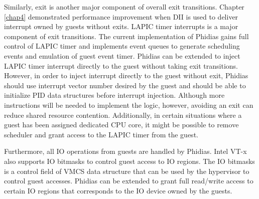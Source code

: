 Similarly, \mextinterrupt{} exit is another major component of overall exit transitions. 
Chapter \ref{chap4} demonstrated performance improvement when DII is used to deliver interrupt owned by guests without exits.
LAPIC timer interrupts is a major component of \mextinterrupt{}  exit transitions.
The current implementation of Phidias gains full control of LAPIC timer and implements event queues 
to generate scheduling events and emulation of guest event timer.
Phidias can be extended to inject LAPIC timer interrupt directly to the guest without taking exit transitions.
However, in order to inject interrupt directly to the guest without exit, Phidias should use interrupt vector number desired by the guest 
and should be able to initialize PID data structures before interrupt injection.
Although more instructions will be needed to implement the logic, however, avoiding an exit can reduce shared resource contention.
Additionally, in certain situations where a guest has been assigned dedicated CPU core, 
it might be possible to remove scheduler and grant access to the LAPIC timer from the guest.

Furthermore, all IO operations from guests are handled by Phidias.
Intel VT-x also supports IO bitmasks to control guest access to IO regions. 
The IO bitmasks is a control field of VMCS data structure that can be used by the hypervisor to control guest accesses.
Phidias can be extended to grant full read/write access to certain IO regions that corresponds to the IO device owned by the guests.


  
